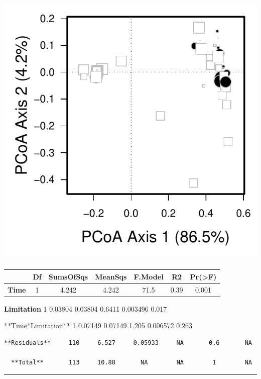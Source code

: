 \documentclass[]{article}
\begin{document}
\subsection{\texorpdfstring{\protect\includegraphics{analysis_ecoevostoich_files/figure-latex/unnamed-chunk-32-1.pdf}}{}}\label{section}

\begin{longtable}[]{@{}ccccccc@{}}
\toprule
~ & Df & SumsOfSqs & MeanSqs & F.Model & R2 &
Pr(\textgreater{}F)\tabularnewline
\midrule
\endhead
\textbf{Time} & 1 & 4.242 & 4.242 & 71.5 & 0.39 & 0.001\tabularnewline
\bottomrule
\end{longtable}

\textbf{Limitation} 1 0.03804 0.03804 0.6411 0.003496 0.017

**Time*Limitation** 1 0.07149 0.07149 1.205 0.006572 0.263

\begin{verbatim}
**Residuals**     110     6.527     0.05933     NA       0.6       NA   

  **Total**       113     10.88       NA        NA        1        NA   
\end{verbatim}

\begin{center}\rule{0.5\linewidth}{\linethickness}\end{center}
\end{document}
